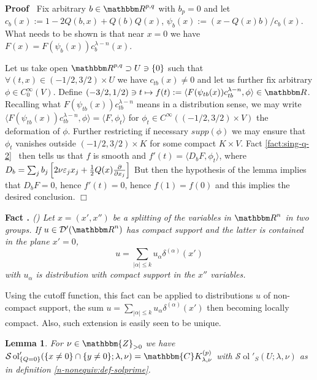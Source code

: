 \documentclass{article}
\newcommand{\assign}{:=}
\newcommand{\tmop}[1]{\ensuremath{\operatorname{#1}}}
\newcommand{\tmtextbf}[1]{{\bfseries{#1}}}
\newcommand{\tmtextit}[1]{{\itshape{#1}}}
\newcommand{\tmtextup}[1]{{\upshape{#1}}}
\newenvironment{proof}{\noindent\textbf{Proof\ }}{\hspace*{\fill}$\Box$\medskip}
\numberwithin{definition}{section}
\newtheorem{lemma}{Lemma}
\numberwithin{lemma}{section}
\numberwithin{proposition}{section}
{\theorembodyfont{\rmfamily}\newtheorem{remark}{Remark}
\numberwithin{remark}{section}
}
\newcommand{\D}{\mathcal{D}} \newcommand{\supp}{supp}
\newcommand{\proofexplanation}[1]{(#1)}
\begin{document}
\begin{proof}
  Fix arbitrary $b \in \R^{p, q}$ with $b_p = 0$ and let $c_b (x) \assign 1 -
  2 Q (b, x) + Q (b) Q (x)$, $\psi_b (x) \assign (x - Q (x) b) / c_b (x)$.
  What needs to be shown is that near $x = 0$ we have $F (x) = F (\psi_b (x))
  c_b^{\lambda - n} (x)$.
  
  Let us take open $\R^{p, q} \supset U \ni \{ 0 \}$ such that $\forall (t, x)
  \in (- 1 / 2, 3 / 2) \times U$ we have $c_{tb} (x) \neq 0$ and let us
  further fix arbitrary $\phi \in C_0^{\infty} (V)$. Define $(- 3 / 2, 1 / 2)
  \ni t \mapsto f (t) \assign \langle F (\psi_{tb} (x)) c_{tb}^{\lambda - n},
  \phi \rangle \in \R$. Recalling what $F (\psi_{tb} (x)) c_{tb}^{\lambda -
  n}$ means in a distribution sense, we may write $\langle F (\psi_{tb} (x))
  c_{tb}^{\lambda - n}, \phi \rangle = \langle F, \phi_t \rangle$ for $\phi_t
  \in C^{\infty} (( - 1 / 2, 3 / 2) \times V)$ the deformation of $\phi$.
  Further restricting if necessary $\supp (\phi)$ we may ensure that $\phi_t$
  vanishes outside $(- 1 / 2, 3 / 2) \times K$ for some compact $K \times V$.
  Fact \ref{fact:sing-q-2} \ then tells us that $f$ is smooth and $f' (t) =
  \langle D_b F, \phi_t \rangle$, where $D_b = \sum_j b_j \left[2 \nu
  \varepsilon_j x_j + \frac{1}{2} Q (x) \frac{\partial}{\partial x_j}\right]$ But
  then the hypothesis of the lemma implies that $D_b F = 0$, hence $f' (t) =
  0$, hence $f (1) = f (0)$ and this implies the desired conclusion.
\end{proof}

{\noindent}\tmtextbf{Fact \tmtextup{17}.
}\tmtextit{{\proofexplanation{{\cite[Thm. 2.3.5]{hormander1983analysis}}}}
\label{fact:sing-q-3}Let $x = (x', x'')$ be a splitting of the variables in
$\R^n$ in two groups. If $u \in \D' ( \R^n)$ has compact support and the
latter is contained in the plane $x' = 0$,
\[ u = \sum_{| \alpha | \leq k} u_{\alpha} \delta^{(\alpha)} (x') \]
with $u_{\alpha}$ is distribution with compact support in the $x''$
variables.}{\hspace*{\fill}}{\medskip}

\begin{remark}
  Using the cutoff function, this fact can be applied to distributions $u$ of
  non-compact support, the sum $u = \sum_{| \alpha | \leq k} u_{\alpha}
  \delta^{(\alpha)} (x')$ then becoming locally compact. Also, such extension
  is easily seen to be unique.
\end{remark}

\begin{lemma}
  \label{lem:sing-q-6}For $\nu \in \mathbbm{Z}_{> 0}$ we have $\mathcal{S}
  \tmop{ol}_{\{ Q = 0 \}}' ( \{ x \neq 0 \} \cap \{ y \neq 0 \} ; \lambda,
  \nu) =\mathbbm{C}K^{( p)}_{\lambda, \nu}$ with $\mathcal{S} \tmop{ol}'_S ( U
  ; \lambda, \nu)$ as in definition \ref{n-nonequiv:def-solprime}.
\end{lemma}
\end{document}
